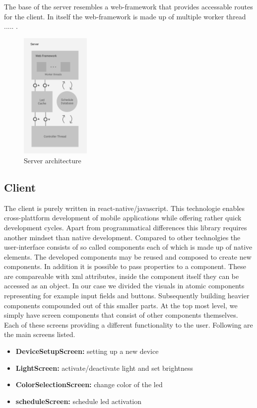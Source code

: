 \documentclass[conference]{IEEEtran}
\begin{document}
The base of the server resembles a web-framework that provides accessable routes for the client. In itself the web-framework is
made up of multiple worker thread ..... .

\begin{figure}[H]
    \centering
    \includegraphics[width=0.3\textwidth]{server_architecture}
    \caption{Server architecture}
\end{figure}

\subsection{Client}
The client is purely written in react-native/javascript. This technologie enables cross-plattform development of mobile applications 
while offering rather quick development cycles. Apart from programmatical differences this library requires another mindset than 
native development. Compared to other technolgies the user-interface consists of so called components each of which is made up of
native elements. The developed components may be reused and composed to create new components. In addition it is possible to pass
properties to a component. These are compareable with xml attributes, inside the component itself they can be accessed as an object. 
In our case we divided the visuals in atomic components representing for example input fields and buttons. Subsequently building
heavier components compounded out of this smaller parts. At the top most level, we simply have screen components that consist of 
other components themselves. Each of these screens providing a different functionality to the user. Following are the main screens
listed.

\vspace{5pt}
\begin{itemize}
    \item \textbf{DeviceSetupScreen:} setting up a new device
    \item \textbf{LightScreen:} activate/deactivate light and set brightness
    \item \textbf{ColorSelectionScreen:} change color of the led
    \item \textbf{scheduleScreen:} schedule led activation 
\end{itemize}
\vspace{12pt}
\end{document}
